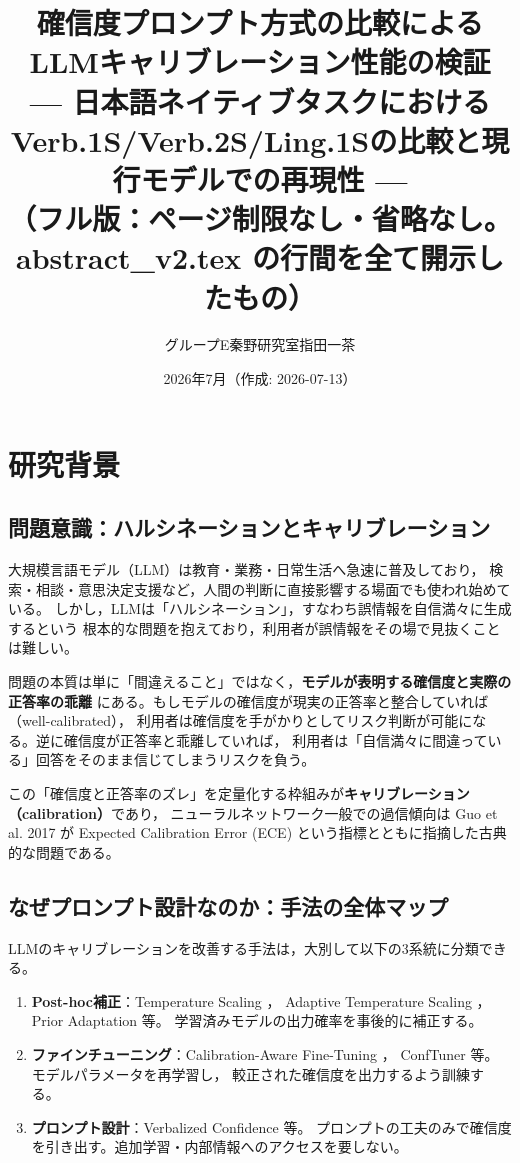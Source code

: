 \documentclass[11pt,a4paper,oneside]{article}
\title{\Large\bfseries 確信度プロンプト方式の比較によるLLMキャリブレーション性能の検証\\
\large --- 日本語ネイティブタスクにおけるVerb.1S/Verb.2S/Ling.1Sの比較と現行モデルでの再現性 ---\\
\normalsize （フル版：ページ制限なし・省略なし。abstract\_v2.tex の行間を全て開示したもの）}
\author{グループE\quad 秦野研究室\quad 7422048\quad 指田一茶}
\date{2026年7月（作成: 2026-07-13）}
\begin{document}
\maketitle

\tableofcontents
\vspace{1em}

\section{研究背景}

\subsection{問題意識：ハルシネーションとキャリブレーション}

大規模言語モデル（LLM）は教育・業務・日常生活へ急速に普及しており，
検索・相談・意思決定支援など，人間の判断に直接影響する場面でも使われ始めている。
しかし，LLMは「ハルシネーション」，すなわち誤情報を自信満々に生成するという
根本的な問題を抱えており\cite{ji2023survey}，利用者が誤情報をその場で見抜くことは難しい。

問題の本質は単に「間違えること」ではなく，\textbf{モデルが表明する確信度と実際の正答率の乖離}
にある。もしモデルの確信度が現実の正答率と整合していれば（well-calibrated），
利用者は確信度を手がかりとしてリスク判断が可能になる。逆に確信度が正答率と乖離していれば，
利用者は「自信満々に間違っている」回答をそのまま信じてしまうリスクを負う。

この「確信度と正答率のズレ」を定量化する枠組みが\textbf{キャリブレーション（calibration）}であり，
ニューラルネットワーク一般での過信傾向は Guo et al. 2017 \cite{guo2017calibration} が
Expected Calibration Error (ECE) という指標とともに指摘した古典的な問題である。

\subsection{なぜプロンプト設計なのか：手法の全体マップ}

LLMのキャリブレーションを改善する手法は，大別して以下の3系統に分類できる。

\begin{enumerate}
  \item \textbf{Post-hoc補正}：Temperature Scaling \cite{guo2017calibration}，
        Adaptive Temperature Scaling \cite{xie2024adaptivetemp}，
        Prior Adaptation \cite{estienne2023prioradaptation} 等。
        学習済みモデルの出力確率を事後的に補正する。
  \item \textbf{ファインチューニング}：Calibration-Aware Fine-Tuning \cite{xiao2025restoringcalibration}，
        ConfTuner \cite{li2025conftuner} 等。モデルパラメータを再学習し，
        較正された確信度を出力するよう訓練する。
  \item \textbf{プロンプト設計}：Verbalized Confidence \cite{tian2023justask,xiong2024llmuncertainty} 等。
        プロンプトの工夫のみで確信度を引き出す。追加学習・内部情報へのアクセスを要しない。
\end{enumerate}
\end{document}
